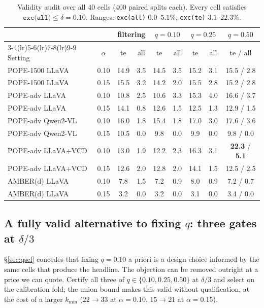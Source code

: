 \documentclass{article}
\theoremstyle{plain}
\theoremstyle{definition}
\theoremstyle{remark}
\begin{document}
\begin{table}[h]
\centering
\caption{Validity audit over all $40$ cells ($400$ paired splits each). Every cell satisfies
$\texttt{exc(all)}\le\delta=0.10$. Ranges: \texttt{exc(all)} $0.0$--$5.1\%$, \texttt{exc(te)}
$3.1$--$22.3\%$.}
\label{tab:audit}
\small
\begin{tabular}{lcccccccc}
\toprule
& & \multicolumn{2}{c}{filtering} & \multicolumn{2}{c}{$q=0.10$}
& \multicolumn{2}{c}{$q=0.25$} & $q=0.50$\\
\cmidrule(lr){3-4}\cmidrule(lr){5-6}\cmidrule(lr){7-8}\cmidrule(lr){9-9}
Setting & $\alpha$ & te & all & te & all & te & all & te / all\\
\midrule
POPE-1500 LLaVA    & 0.10 & 14.9 & 3.5 & 14.5 & 3.5 & 15.2 & 3.1 & 15.5 / 2.8\\
POPE-1500 LLaVA    & 0.15 & 15.5 & 3.2 & 14.2 & 2.0 & 15.5 & 2.8 & 15.2 / 2.8\\
POPE-adv LLaVA     & 0.10 & 10.8 & 2.5 & 10.6 & 3.3 & 15.3 & 4.0 & 16.6 / 3.7\\
POPE-adv LLaVA     & 0.15 & 14.1 & 0.8 & 12.6 & 1.5 & 12.5 & 1.3 & 12.9 / 1.5\\
POPE-adv Qwen2-VL  & 0.10 & 16.0 & 1.8 & 15.4 & 1.8 & 17.0 & 3.0 & 17.6 / 3.6\\
POPE-adv Qwen2-VL  & 0.15 & 10.5 & 0.0 & \phantom{0}9.8 & 0.0 & \phantom{0}9.9 & 0.0 & \phantom{0}9.8 / 0.0\\
POPE-adv LLaVA+VCD & 0.10 & 13.0 & 1.9 & 12.2 & 2.3 & 16.3 & 3.1 & \textbf{22.3} / \textbf{5.1}\\
POPE-adv LLaVA+VCD & 0.15 & 12.6 & 2.0 & 12.8 & 2.0 & 14.1 & 1.5 & 12.5 / 2.5\\
AMBER(d) LLaVA     & 0.10 & \phantom{0}7.8 & 1.5 & \phantom{0}7.2 & 0.9 & \phantom{0}8.0 & 0.9 & \phantom{0}7.2 / 0.7\\
AMBER(d) LLaVA     & 0.15 & \phantom{0}3.2 & 0.0 & \phantom{0}3.2 & 0.0 & \phantom{0}3.1 & 0.0 & \phantom{0}3.4 / 0.0\\
\bottomrule
\end{tabular}
\end{table}

\subsection{A fully valid alternative to fixing $q$: three gates at $\delta/3$}
\label{app:qdelta}
\S\ref{sec:qsel} concedes that fixing $q=0.10$ a priori is a design choice informed by the same
cells that produce the headline. The objection can be removed outright at a price we can quote.
Certify all three of $q\in\{0.10,0.25,0.50\}$ at $\delta/3$ and select on the calibration fold;
the union bound makes this valid without qualification, at the cost of a larger $k_{\min}$
($22\to33$ at $\alpha=0.10$, $15\to21$ at $\alpha=0.15$).
\end{document}
